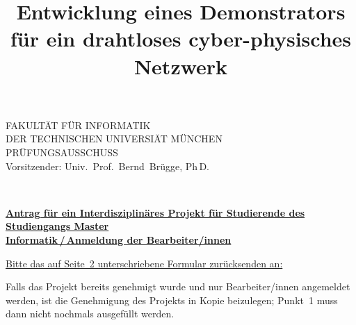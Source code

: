 \documentclass[german,11pt,a4paper]{netforms}
\title{Entwicklung eines Demonstrators für ein drahtloses cyber-physisches Netzwerk}{Development of a Demonstrator for a Wireless Cyber-Physical Network}
\begin{document}
	\begin{minipage}{.2\textwidth}%
		\centering
	\end{minipage}%
	\begin{minipage}{.6\textwidth}%
		\centering
		\huge\textsc{FAKULT\"AT F\"UR INFORMATIK}\large\\[-.2ex]
		\textsc{DER TECHNISCHEN UNIVERSI\"AT M\"UNCHEN}\\[-.2ex]
		\textsc{PR\"UFUNGSAUSSCHUSS}\\[-.2ex]
		Vorsitzender: Univ.~Prof.~Bernd~Br\"ugge, Ph\,D.
	\end{minipage}%
	\begin{minipage}{.2\textwidth}%
		\centering
	\end{minipage}\\[1ex]

	\begin{center}
		\textbf{%
			\large
			\underline{Antrag f\"ur ein Interdisziplin\"ares Projekt f\"ur
			Studierende des Studiengangs Master}\\[.2ex]
			\underline{Informatik\,/\,Anmeldung der Bearbeiter/innen}
		}
	\end{center}

	\vspace{1ex}
	{%
		\footnotesize
		\underline{Bitte das auf Seite~2 unterschriebene Formular
		zur\"ucksenden an:}
	}

	\vspace{.5ex}
	\hspace{.5ex}

	\vspace{\baselineskip}
	Falls das Projekt bereits genehmigt wurde und nur Bearbeiter/innen
	angemeldet werden, ist die Genehmigung des Projekts in Kopie beizulegen;
	Punkt~1 muss dann nicht nochmals ausgef\"ullt werden.
\end{document}
